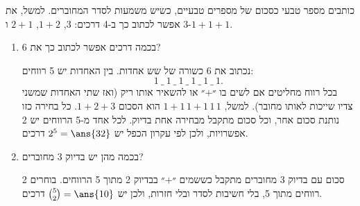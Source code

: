 כותבים מספר טבעי כסכום של מספרים טבעיים, כשיש משמעות לסדר המחוברים. למשל, את 3 אפשר לכתוב כך ב-4 דרכים: $3$, $1+2$, $2+1$ ו-$1+1+1$.
\begin{enumerate}
\item בכמה דרכים אפשר לכתוב כך את 6?
\begin{solbox}
נכתוב את 6 כשורה של שש אחדות. בין האחדות יש 5 רווחים:
\[
1\ \_\ 1\ \_\ 1\ \_\ 1\ \_\ 1\ \_\ 1.
\]
בכל רווח מחליטים אם לשים בו ״$+$״ או להשאיר אותו ריק (ואז שתי האחדות שמשני צדיו שייכות לאותו מחובר). למשל, $1+1\,1+1\,1\,1$ הוא הסכום $1+2+3$. כל בחירה כזו נותנת סכום אחר, וכל סכום מתקבל מבחירה אחת בדיוק. לכל אחד מ-5 הרווחים יש 2 אפשרויות, ולכן לפי עקרון הכפל יש $2^5=\ans{32}$ דרכים.
\end{solbox}
\item בכמה מהן יש בדיוק 3 מחוברים?
\begin{solbox}
סכום עם בדיוק 3 מחוברים מתקבל כששמים ״$+$״ בבדיוק 2 מתוך 5 הרווחים. בוחרים 2 רווחים מתוך 5, בלי חשיבות לסדר ובלי חזרות, ולכן יש $\binom52=\ans{10}$ דרכים.
\end{solbox}
\end{enumerate}

